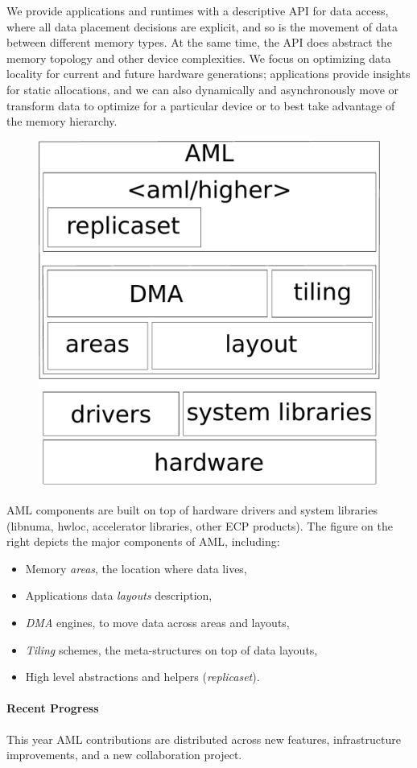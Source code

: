 We provide applications and runtimes with a descriptive API for data
access, where all data placement decisions are explicit, and so is the
movement of data between different memory types.  At the same time, the API
does abstract the memory topology and other device complexities.  We focus
on optimizing data locality for current and future hardware generations;
applications provide insights for static allocations, and we can also
dynamically and asynchronously move or transform data to optimize for a particular 
device or to best take advantage of the memory hierarchy.

\begin{figure}
\includegraphics[width=.18\textwidth]{projects/2.3.1-PMR/2.3.1.19-Argo-PowerSteering/aml-components}
\end{figure}
AML components are built on top of hardware drivers and system
libraries (libnuma, hwloc, accelerator libraries, other ECP products).
The figure on the right depicts the major components of AML, including:
\begin{itemize}
\item Memory \emph{areas}, the location where data lives,
\item Applications data \emph{layouts} description,
\item \emph{DMA} engines, to move data across areas and layouts,
\item \emph{Tiling} schemes, the meta-structures on top of data layouts,
\item High level abstractions and helpers (\emph{replicaset}).
\end{itemize}

\paragraph{Recent Progress}

This year AML contributions are distributed across new features,
infrastructure improvements, and a new collaboration project.

